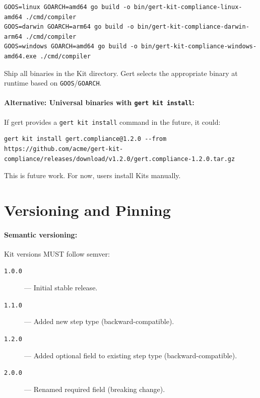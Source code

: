 \begin{verbatim}
GOOS=linux GOARCH=amd64 go build -o bin/gert-kit-compliance-linux-amd64 ./cmd/compiler
GOOS=darwin GOARCH=arm64 go build -o bin/gert-kit-compliance-darwin-arm64 ./cmd/compiler
GOOS=windows GOARCH=amd64 go build -o bin/gert-kit-compliance-windows-amd64.exe ./cmd/compiler
\end{verbatim}

Ship all binaries in the Kit directory. Gert selects the appropriate binary at
runtime based on \texttt{GOOS}/\texttt{GOARCH}.

\paragraph{Alternative: Universal binaries with \texttt{gert kit install}:}

If gert provides a \texttt{gert kit install} command in the future, it could:

\begin{verbatim}
gert kit install gert.compliance@1.2.0 --from https://github.com/acme/gert-kit-compliance/releases/download/v1.2.0/gert.compliance-1.2.0.tar.gz
\end{verbatim}

This is future work. For now, users install Kits manually.

\section{Versioning and Pinning}
\label{sec:versioning-pinning}

\paragraph{Semantic versioning:}

Kit versions MUST follow semver:

\begin{description}
  \item[\texttt{1.0.0}] --- Initial stable release.
  \item[\texttt{1.1.0}] --- Added new step type (backward-compatible).
  \item[\texttt{1.2.0}] --- Added optional field to existing step type
    (backward-compatible).
  \item[\texttt{2.0.0}] --- Renamed required field (breaking change).
\end{description}


